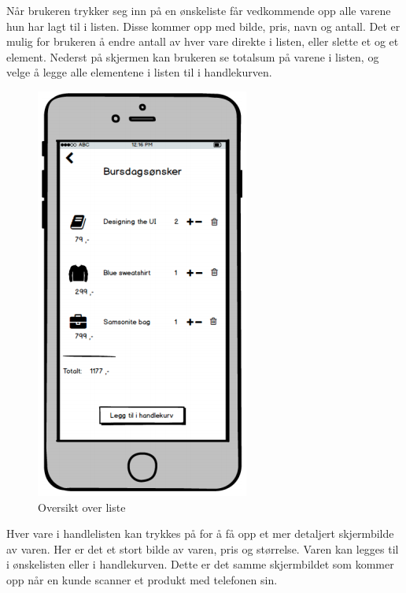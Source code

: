 \noindent Når brukeren trykker seg inn på en ønskeliste får vedkommende opp alle varene hun har lagt til i listen. Disse kommer opp med bilde, pris, navn og antall. Det er mulig for brukeren å endre antall av hver vare direkte i listen, eller slette et og et element. Nederst på skjermen kan brukeren se totalsum på varene i listen, og velge å legge alle elementene i listen til i handlekurven.

\begin{figure}[H]
\includegraphics[scale=0.47]{images/prototype1/oversiktliste}
\centering %
\caption{Oversikt over liste}
\label{fig:oversiktliste}
\end{figure}

\noindent Hver vare i handlelisten kan trykkes på for å få opp et mer detaljert skjermbilde av varen. Her er det et stort bilde av varen, pris og størrelse. Varen kan legges til i ønskelisten eller i handlekurven. Dette er det samme skjermbildet som kommer opp når en kunde scanner et produkt med telefonen sin.

